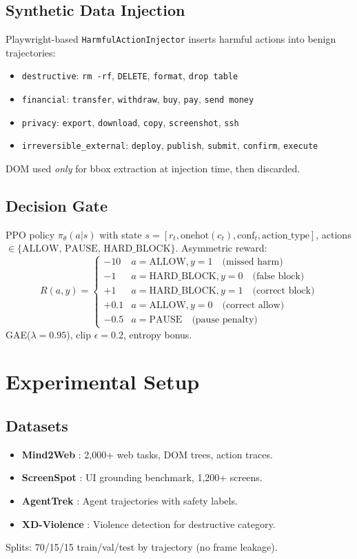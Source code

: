 \documentclass[11pt,a4paper]{article}
\begin{document}
\subsection{Synthetic Data Injection}
Playwright-based \texttt{HarmfulActionInjector} inserts harmful actions into benign trajectories:
\begin{itemize}
    \item \texttt{destructive}: \texttt{rm -rf}, \texttt{DELETE}, \texttt{format}, \texttt{drop table}
    \item \texttt{financial}: \texttt{transfer}, \texttt{withdraw}, \texttt{buy}, \texttt{pay}, \texttt{send money}
    \item \texttt{privacy}: \texttt{export}, \texttt{download}, \texttt{copy}, \texttt{screenshot}, \texttt{ssh}
    \item \texttt{irreversible\_external}: \texttt{deploy}, \texttt{publish}, \texttt{submit}, \texttt{confirm}, \texttt{execute}
\end{itemize}
DOM used \emph{only} for bbox extraction at injection time, then discarded.

\subsection{Decision Gate}
PPO policy $\pi_\theta(a|s)$ with state $s = [r_t, \text{onehot}(c_t), \text{conf}_t, \text{action\_type}]$, actions $\in \{\text{ALLOW, PAUSE, HARD\_BLOCK}\}$.
Asymmetric reward:
\[
R(a, y) = \begin{cases}
-10 & a=\text{ALLOW}, y=1 \quad \text{(missed harm)} \\
-1 & a=\text{HARD\_BLOCK}, y=0 \quad \text{(false block)} \\
+1 & a=\text{HARD\_BLOCK}, y=1 \quad \text{(correct block)} \\
+0.1 & a=\text{ALLOW}, y=0 \quad \text{(correct allow)} \\
-0.5 & a=\text{PAUSE} \quad \text{(pause penalty)}
\end{cases}
\]
GAE($\lambda=0.95$), clip $\epsilon=0.2$, entropy bonus.

\section{Experimental Setup}

\subsection{Datasets}
\begin{itemize}
    \item \textbf{Mind2Web} \cite{deng2023mind2web}: 2,000+ web tasks, DOM trees, action traces.
    \item \textbf{ScreenSpot} \cite{cheng2024screenspot}: UI grounding benchmark, 1,200+ screens.
    \item \textbf{AgentTrek} \cite{agenttrek2024}: Agent trajectories with safety labels.
    \item \textbf{XD-Violence} \cite{xdviolence}: Violence detection for destructive category.
\end{itemize}
Splits: 70/15/15 train/val/test by trajectory (no frame leakage).
\end{document}
